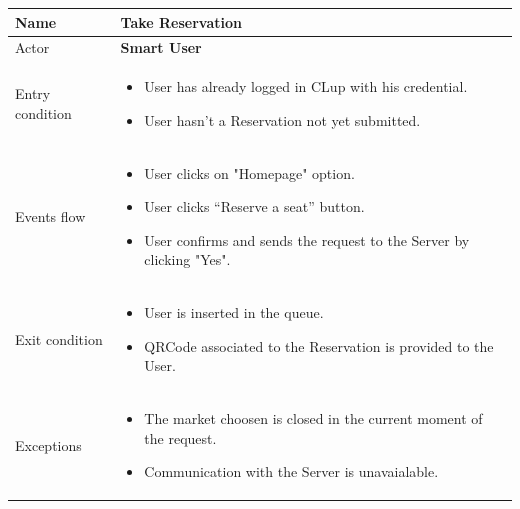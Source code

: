\begin{tabular}{|p{5cm} | p{7cm} | }
	\hline
	Name & \textbf{Take Reservation} \\
	\hline
	Actor & \textbf{Smart User} \\
	\hline
	Entry condition &
	\begin{itemize}
		\item User has already logged in CLup with his credential. 
		\item User hasn't a Reservation not yet submitted. 
	\end{itemize} \\
	\hline
	Events flow & 
	\begin{itemize}
		\item User clicks on "Homepage" option.
		\item User clicks “Reserve a seat” button.
		\item User confirms and sends the request to the Server by clicking "Yes".
	\end{itemize} \\
	\hline
	Exit condition &
	\begin{itemize}	
		\item User is inserted in the queue.
		\item QRCode associated to the Reservation is provided to the User. 
	\end{itemize} \\
	\hline 
	Exceptions & \begin{itemize}
    \item The market choosen is closed in the current moment of the request.
    \item Communication with the Server is unavaialable.
    \end{itemize}
 \\
	\hline
\end{tabular}

\par \medskip

